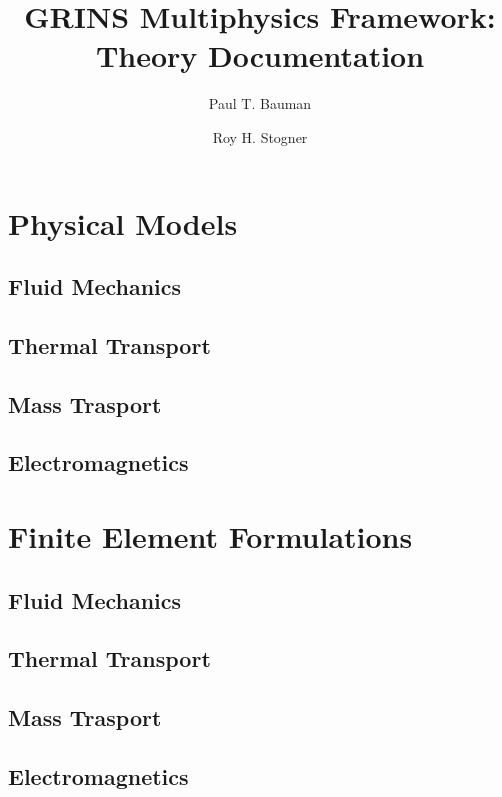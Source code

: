 \documentclass[twoside]{report}
\begin{document}
\author{Paul T. Bauman \and Roy H. Stogner}
\title{GRINS Multiphysics Framework:\\
Theory Documentation}
\maketitle
\tableofcontents

\part{Physical Models}

\chapter{Fluid Mechanics}

\chapter{Thermal Transport}

\chapter{Mass Trasport}

\chapter{Electromagnetics}

\part{Finite Element Formulations}

\chapter{Fluid Mechanics}

\chapter{Thermal Transport}

\chapter{Mass Trasport}

\chapter{Electromagnetics}
\end{document}
